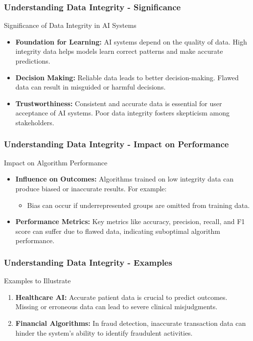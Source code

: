 \documentclass{beamer}
\begin{document}
\begin{frame}[fragile]
    \frametitle{Understanding Data Integrity - Significance}
    \begin{block}{Significance of Data Integrity in AI Systems}
        \begin{itemize}
            \item \textbf{Foundation for Learning:} AI systems depend on the quality of data. High integrity data helps models learn correct patterns and make accurate predictions.
            \item \textbf{Decision Making:} Reliable data leads to better decision-making. Flawed data can result in misguided or harmful decisions.
            \item \textbf{Trustworthiness:} Consistent and accurate data is essential for user acceptance of AI systems. Poor data integrity fosters skepticism among stakeholders.
        \end{itemize}
    \end{block}
\end{frame}

\begin{frame}[fragile]
    \frametitle{Understanding Data Integrity - Impact on Performance}
    \begin{block}{Impact on Algorithm Performance}
        \begin{itemize}
            \item \textbf{Influence on Outcomes:} Algorithms trained on low integrity data can produce biased or inaccurate results. For example:
            \begin{itemize}
                \item Bias can occur if underrepresented groups are omitted from training data.
            \end{itemize}
            \item \textbf{Performance Metrics:} Key metrics like accuracy, precision, recall, and F1 score can suffer due to flawed data, indicating suboptimal algorithm performance.
        \end{itemize}
    \end{block}
\end{frame}

\begin{frame}[fragile]
    \frametitle{Understanding Data Integrity - Examples}
    \begin{block}{Examples to Illustrate}
        \begin{enumerate}
            \item \textbf{Healthcare AI:} Accurate patient data is crucial to predict outcomes. Missing or erroneous data can lead to severe clinical misjudgments.
            \item \textbf{Financial Algorithms:} In fraud detection, inaccurate transaction data can hinder the system's ability to identify fraudulent activities.
        \end{enumerate}
    \end{block}
\end{frame}
\end{document}
